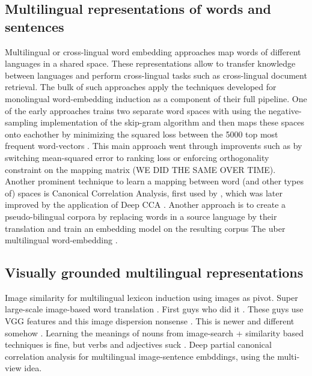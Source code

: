 \subsection{Multilingual representations of words and sentences}
Multilingual or cross-lingual word embedding approaches map words of different languages in a shared space. These representations allow to transfer knowledge between languages and
perform cross-lingual tasks such as cross-lingual document retrieval. The bulk of such approaches apply the techniques developed for monolingual word-embedding induction as a component
of their full pipeline. One of the early approaches trains two separate word spaces with using the negative-sampling implementation of the skip-gram algorithm and then maps these spaces onto eachother by minimizing the squared loss between the 5000 top most frequent word-vectors \cite{mikolov2013exploiting}. This main approach went through improvents
such as by switching mean-squared error to ranking loss \cite{lazaridou2015hubness} or enforcing orthogonality constraint on the mapping matrix
\cite{xing2015normalized}   (WE DID THE SAME OVER TIME). Another prominent technique to learn a mapping between word (and other types of) spaces is Canonical Correlation Analysis, first
used by \cite{faruqui2014improving}, which was later improved by the application of Deep CCA \cite{lu2015deep}. Another approach is to create a pseudo-bilingual corpora by replacing words
in a source language by their translation and train an embedding model on the resulting corpus
The uber multilingual word-embedding \cite{ammar2016massively}.

\subsection{Visually grounded multilingual representations}
Image similarity for multilingual lexicon induction using images as pivot.
Super large-scale image-based word translation \cite{hewitt2018learning}.
First guys who did it \cite{bergsma2011learning}. These guys use VGG features and this image dispersion nonsense \cite{kiela2014improving}.
This is newer and different somehow \cite{vulic2016multi}.
Learning the meanings of nouns from image-search + similarity based techniques is fine, but verbs and adjectives
suck \cite{hartmann2017limitations}. Deep partial canonical correlation analysis for \cite{rotman2018bridging}
multilingual image-sentence embddings, using the multi-view idea.


